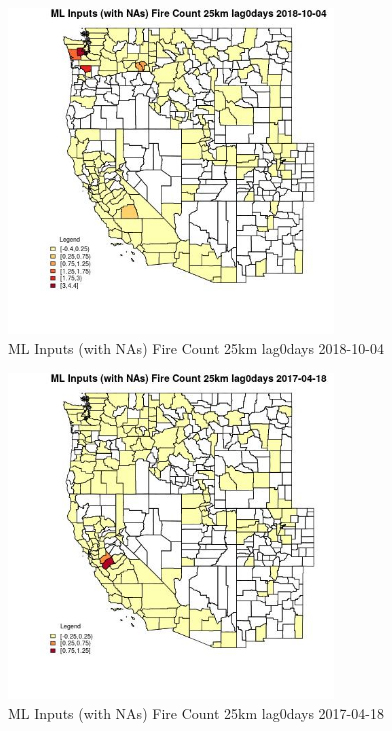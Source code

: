 \begin{figure} 
\centering  
\includegraphics[width=0.77\textwidth]{Code_Outputs/Report_ML_input_PM25_Step4_part_f_de_duplicated_aves_prioritize_24hr_obswNAs_CountyFire_Count_25km_lag0daysMean2018-10-04.jpg} 
\caption{\label{fig:Report_ML_input_PM25_Step4_part_f_de_duplicated_aves_prioritize_24hr_obswNAsCountyFire_Count_25km_lag0daysMean2018-10-04}ML Inputs (with NAs) Fire Count 25km lag0days 2018-10-04} 
\end{figure} 
 

\begin{figure} 
\centering  
\includegraphics[width=0.77\textwidth]{Code_Outputs/Report_ML_input_PM25_Step4_part_f_de_duplicated_aves_prioritize_24hr_obswNAs_CountyFire_Count_25km_lag0daysMean2017-04-18.jpg} 
\caption{\label{fig:Report_ML_input_PM25_Step4_part_f_de_duplicated_aves_prioritize_24hr_obswNAsCountyFire_Count_25km_lag0daysMean2017-04-18}ML Inputs (with NAs) Fire Count 25km lag0days 2017-04-18} 
\end{figure} 
 

